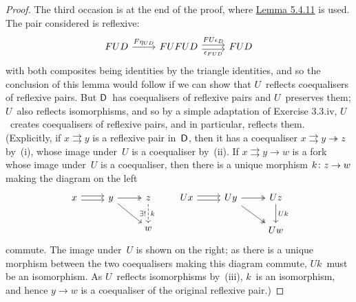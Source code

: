 \documentclass[../../solutions]{subfiles}
\begin{document}
\begin{proof}
  The third occasion is at the end of the proof, where
  \hyperref[lemma:5.4.11]{Lemma 5.4.11} is used.  The pair considered
  is reflexive:
  $$
  \begin{tikzcd}
    FUD
    \ar[r, "F\eta_{UD}"]
    &
    FUFUD
    \ar[r, shift left=0.5ex, "FU\epsilon_D"]
    \ar[r, shift right=0.5ex, "\epsilon_{FUD}"']
    & FUD
  \end{tikzcd}
  $$
  with both composites being identities by the triangle identities,
  and so the conclusion of this lemma would follow if we can show that
  $U$~reflects coequalisers of reflexive pairs.  But ${\mathsf{D}}$~has
  coequalisers of reflexive pairs and $U$~preserves them; $U$~also
  reflects isomorphisms, and so by a simple adaptation of Exercise
  3.3.iv, $U$~creates coequalisers of reflexive pairs, and in
  particular, reflects them.  (Explicitly, if $x\rightrightarrows y$
  is a reflexive pair in~${\mathsf{D}}$, then it has a coequaliser
  $x\rightrightarrows y\twoheadrightarrow z$ by~(i), whose image
  under~$U$ is a coequaliser by~(ii).  If $x\rightrightarrows y\to w$
  is a fork whose image under~$U$ is a coequaliser, then there is a
  unique morphism ${k}\colon{z}\to{w}$ making the diagram on the left
  $$
  \begin{tikzcd}
    x
    \ar[r, shift left=0.5ex]
    \ar[r, shift right=0.5ex]
    & y
    \ar[r, twoheadrightarrow]
    \ar[dr]
    & z
    \ar[d, dashed, "\exists!\strut"', "k\strut"]
    \\
    && w
  \end{tikzcd}
  \qquad
  \begin{tikzcd}
    Ux
    \ar[r, shift left=0.5ex]
    \ar[r, shift right=0.5ex]
    & Uy
    \ar[r, twoheadrightarrow]
    \ar[dr, twoheadrightarrow]
    & Uz
    \ar[d, "Uk"]
    \\
    && Uw
  \end{tikzcd}  
  $$
  commute.  The image under~$U$ is shown on the right; as there is a
  unique morphism between the two coequalisers making this diagram
  commute, $Uk$~must be an isomorphism.  As $U$~reflects isomorphisms
  by~(iii), $k$~is an isomorphism, and hence $y\to w$ is a coequaliser
  of the original reflexive pair.)
\end{proof}
\end{document}
